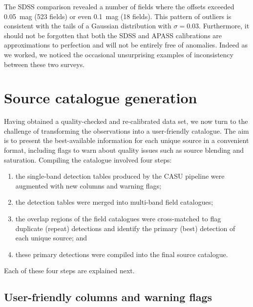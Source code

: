 \documentclass[a4paper,useAMS,usenatbib]{mn2e}
\begin{document}
The SDSS comparison revealed a number of fields where the offsets
exceeded 0.05~mag (523 fields) or even 0.1~mag (18 fields).
This pattern of outliers is consistent with the tails of a Gaussian distribution
with $\sigma=0.03$.  Furthermore, it should not
be forgotten that both the SDSS and APASS calibrations are approximations to
perfection and will not be entirely free of anomalies.  Indeed as we worked, 
we noticed the occasional unsurprising examples of inconsistency between these 
two surveys.

\section{Source catalogue generation}
\label{sec:catalogue}

Having obtained a quality-checked 
and re-calibrated data set, 
we now turn to the challenge
of transforming the observations 
into a user-friendly catalogue.
The aim is to present
the best-available information for each unique source
in a convenient format,
including flags to warn about quality issues 
such as source blending and saturation.
Compiling the catalogue involved four steps:
\begin{enumerate}
\item the single-band detection tables 
produced by the CASU pipeline 
were augmented with new columns
and warning flags;
\item the detection tables were merged into multi-band field catalogues;
\item the overlap regions of the field catalogues 
were cross-matched to flag duplicate (repeat) detections 
and identify the primary (best) detection 
of each unique source; and
\item these primary detections
were compiled into the final source catalogue.
\end{enumerate}
Each of these four steps are explained next.

\subsection{User-friendly columns and warning flags}
\end{document}
